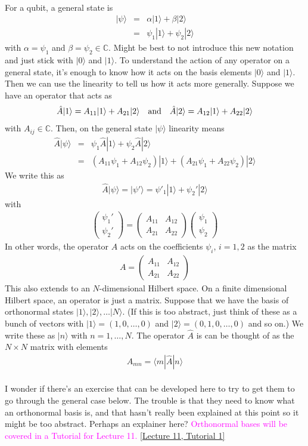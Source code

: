 \documentclass[12pt]{article}
\def\be{\begin{eqnarray}}
\def\ee{\end{eqnarray}}
\newcommand{\nn}{\nonumber}
\newcommand\para{\paragraph{}}
\newcommand{\ket}[1]{|#1\rangle}
\newcommand{\bra}[1]{\langle#1|}
\newcommand{\co}{\color{olive}}
\newcommand{\cblue}{\color{blue}}
\newcommand{\C}{{\mathds C}}
\newcommand{\alyssa}{\textcolor{magenta}}
\begin{document}
{\para
{\co For a qubit, a general state is
%
\be \ket{\psi} &=& \alpha \ket{1} + \beta \ket{2}\nn \\
&=&\psi_1 \ket{1} + \psi_2 \ket{2}\ee
%
with $\alpha=\psi_1$ and $\beta=\psi_2\in \C$.} {\cblue Might be best to not introduce this new notation and just stick with $\ket{0}$ and $\ket{1}$.} To understand the action of any operator on a general state, it's enough to know how it acts on the basis elements $\ket{0}$ and $\ket{1}$. Then we can use the linearity to tell us how it acts more generally. {\co Suppose we have an operator that acts as
%
\be \hat{A} \ket{1} = A_{11} \ket{1} + A_{21} \ket{2}\ \ \ {\rm and}\ \ \ \hat{A}\ket{2} = A_{12}\ket{1} + A_{22} \ket{2}\nn\ee
%
with $A_{ij} \in \C$. Then, on the general state $\ket{\psi}$ linearity means 
%
\be \hat{A} \ket{\psi} &=& \psi_1 \hat{A}\ket{1} + \psi_2 \hat{A}\ket{2} \nn\\
&=& (A_{11} \psi_1 + A_{12}\psi_2) \ket{1} + (A_{21} \psi_1 + A_{22} \psi_2)\ket{2}\nn\ee
%
We write this as 
%
\be \hat{A} \ket{\psi} = \ket{\psi'} = \psi'_1 \ket{1} + \psi_2'\ket{2}\nn\ee
%
with 
%
\be \left(\begin{array}{c}\psi_1' \\ \psi_2' \end{array}\right)  = \left(\begin{array}{cc} A_{11}  & A_{12} \\ A_{21} & A_{22}\end{array}\right)
\left(\begin{array}{c}\psi_1 \\ \psi_2 \end{array}\right)\nn\ee
%
In other words, the operator $\hat{A}$ acts  on the coefficients $\psi_i$, $i=1,2$ as the matrix 
%
\be A = \left(\begin{array}{cc} A_{11}  & A_{12} \\ A_{21} & A_{22}\end{array}\right)\nn\ee
%
This also extends to an $N$-dimensional Hilbert space. On a finite dimensional Hilbert space, an operator is just a matrix. Suppose that we have the basis of orthonormal states $\ket{1}, \ket{2},\ldots \ket{N}$.}  (If this is too abstract, just think of these as a bunch of vectors with $\ket{1} = (1,0,\ldots,0)$ and $\ket{2} = (0,1,0,\ldots,0)$ and so on.) {\co We write these as $\ket{n}$ with $n=1,\ldots,N$. The operator $\hat{A}$ is can be thought of as the $N\times N$ matrix with elements 
%
\be A_{mn} = \bra{m} \hat{A}\ket{n}\nn\ee
%
}

\para
{\cblue I wonder if there's an exercise that can be developed here to try to get them to go through the general case below. The trouble is that they need to know what an orthonormal  basis is, and that hasn't really been explained at this point so it might be too abstract. Perhaps an explainer here? \alyssa{Orthonormal bases will be covered in a Tutorial for Lecture 11.} \href{https://drive.google.com/file/d/1XUNPlwBXt7FwrGpnGGXUjOZRcmQ9BdIB/view?usp=drive_link}{[Lecture 11, Tutorial 1]}


}}
\end{document}
